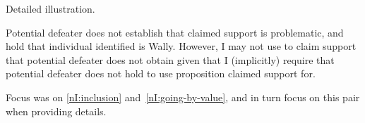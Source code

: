 \begin{note}[Summary]
  Detailed illustration.

  Potential defeater does not establish that claimed support is problematic, and hold that individual identified is Wally.
  However, I may not use to claim support that potential defeater does not obtain given that I (implicitly) require that potential defeater does not hold to use proposition claimed support for.

  Focus was on \ref{nI:inclusion} and~\ref{nI:going-by-value}, and in turn focus on this pair when providing details.
\end{note}

